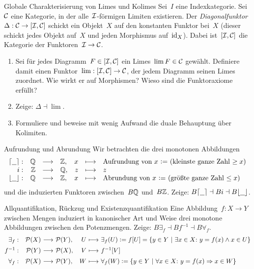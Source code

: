 \documentclass{uebblatt}
\begin{document}
\newpage
\begin{aufgabe}{Globale Charakterisierung von Limes und Kolimes}
Sei~$I$ eine Indexkategorie. Sei~$\mathcal{C}$ eine Kategorie, in der alle~$\mathcal{I}$-förmigen
Limiten existieren. Der \emph{Diagonalfunktor}~$\Delta : \mathcal{C} \to
[\mathcal{I},\mathcal{C}]$ schickt ein Objekt~$X$ auf den konstanten Funktor bei~$X$ (dieser
schickt jedes Objekt auf~$X$ und jeden Morphismus auf~$\mathrm{id}_X$). Dabei
ist~$[\mathcal{I},\mathcal{C}]$ die Kategorie der Funktoren~$\mathcal{I} \to \mathcal{C}$.
\begin{enumerate}
\item Sei für jedes Diagramm~$F \in [\mathcal{I},\mathcal{C}]$ ein Limes~$\lim F \in \mathcal{C}$ gewählt.
Definiere damit einen Funktor~$\lim : [\mathcal{I},\mathcal{C}] \to \mathcal{C}$, der jedem Diagramm
seinen Limes zuordnet. Wie wirkt er auf Morphismen? Wieso sind die
Funktoraxiome erfüllt?
\item Zeige: $\Delta \dashv \lim$.
\item Formuliere und beweise mit wenig Aufwand die duale Behauptung
über Kolimiten.
\end{enumerate}
\end{aufgabe}

\begin{aufgabe}{Aufrundung und Abrundung}
Wir betrachten die drei monotonen Abbildungen
\[ \begin{array}{@{}rrclrcl@{}}
  \lceil\smallplaceholder\rceil: & \QQ &\longrightarrow& \ZZ, &
  x &\longmapsto& \text{Aufrundung von~$x$ $\defeq$ (kleinste ganze Zahl~$\geq x$)} \\
  i: & \ZZ &\longrightarrow& \QQ, &
  z &\longmapsto& z \\
  \lfloor\smallplaceholder\rfloor: & \QQ &\longrightarrow& \ZZ, &
  x &\longmapsto& \text{Abrundung von~$x$ $\defeq$ (größte ganze Zahl~$\leq x$)}
\end{array} \]
und die induzierten Funktoren zwischen~$B\mathbb{Q}$ und~$B\mathbb{Z}$.
Zeige:
$B\lceil\underline{\ \ }\rceil \dashv Bi \dashv B\lfloor\underline{\ \ }\rfloor$.
\end{aufgabe}

\begin{aufgabe}{Allquantifikation, Rückzug und Existenzquantifikation}
Eine Abbildung~$f : X \to Y$ zwischen Mengen induziert in kanonischer Art und
Weise drei monotone Abbildungen zwischen den Potenzmengen.
Zeige: $B\exists_f \dashv Bf^{-1} \dashv B\forall_f$.
\[ \begin{array}{@{}rr@{\ }c@{\ }lr@{\ }c@{\ }l@{}}
  \exists_f : & \P(X) &\longrightarrow& \P(Y), &
    U &\longmapsto& \exists_f(U) \defeq f[U] = \{ y \in Y \ |\ \exists x \in
    X{:}\ y = f(x) \wedge x \in U \} \\[0.5em]
  f^{-1} : & \P(Y) &\longrightarrow& \P(X), &
    V &\longmapsto& f^{-1}[V] \\[0.5em]
  \forall_f : & \P(X) &\longrightarrow& \P(Y), &
    W &\longmapsto& \forall_f(W) \defeq \{ y \in Y \ |\ \forall x \in X{:}\
      y = f(x) \Rightarrow x \in W \}
\end{array} \]
\vspace{-1em}
\end{aufgabe}
\end{document}
